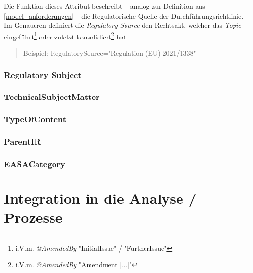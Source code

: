 Die Funktion dieses Attribut beschreibt -- analog zur Definition aus \ref{model_anforderungen} -- die Regulatorische Quelle der Durchführungsrichtlinie.
Im Genaueren definiert die \textit{Regulatory Source} den Rechtsakt, welcher das \textit{Topic} eingeführt\footnote{i.V.m. \textit{@AmendedBy} \textsf{"{}InitialIssue"} / "FurtherIssue"} oder zuletzt konsolidiert\footnote{i.V.m. \textit{@AmendedBy} \textsf{"{}Amendment [...]"}} hat \cite[27]{easa_xml_doc}. 

    \begin{quote}
    Beispiel:
    \textsf{RegulatorySource="{}Regulation (EU) 2021/1338"}
\end{quote}

    \subsubsection{Regulatory Subject}



    \subsubsection{TechnicalSubjectMatter}




    
    \subsubsection{TypeOfContent}

    
    \subsubsection{ParentIR}

    
    \subsubsection{EASACategory}

    

    \pagebreak
    \section{Integration in die Analyse / Prozesse}